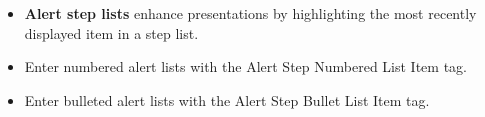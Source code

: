 \documentclass[notes=show,beamer]{beamer}
\makeatletter
\newenvironment{stepitemizewithalert}{\begin{itemize}[<+-| alert@+>]}{\end{itemize} }
\makeatother
\begin{document}
\begin{frame}%



\begin{stepitemizewithalert}
\item \textbf{Alert step lists} enhance presentations by highlighting the
most recently displayed item in a step list.

\item Enter numbered alert lists with the Alert Step Numbered List Item tag.

\item Enter bulleted alert lists with the Alert Step Bullet List Item tag.
\end{stepitemizewithalert}

\transboxout%
\end{frame}%
\end{document}
